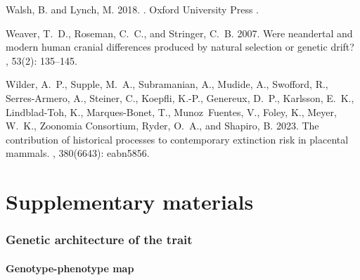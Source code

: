 \documentclass{article}
\renewcommand{\baselinestretch}{1.5}
\providecommand{\DIFdelbegin}{} %
\providecommand{\DIFdelend}{} %
\newcommand{\DIFscaledelfig}{0.5}
\newlength{\DIFdelgraphicswidth} %
\newlength{\DIFdelgraphicsheight} %
\newcommand{\DIFdelincludegraphics}[2][]{%
\sbox{\DIFdelgraphicsbox}{\DIFOincludegraphics[#1]{#2}}%
\settoboxwidth{\DIFdelgraphicswidth}{\DIFdelgraphicsbox} %
\settoboxtotalheight{\DIFdelgraphicsheight}{\DIFdelgraphicsbox} %
\scalebox{\DIFscaledelfig}{%
\parbox[b]{\DIFdelgraphicswidth}{\usebox{\DIFdelgraphicsbox}\\[-\baselineskip] \rule{\DIFdelgraphicswidth}{0em}}\llap{\resizebox{\DIFdelgraphicswidth}{\DIFdelgraphicsheight}{%
\setlength{\unitlength}{\DIFdelgraphicswidth}%
\begin{picture}(1,1)%
\thicklines\linethickness{2pt} %
{\color[rgb]{1,0,0}\put(0,0){\framebox(1,1){}}}%
{\color[rgb]{1,0,0}\put(0,0){\line( 1,1){1}}}%
{\color[rgb]{1,0,0}\put(0,1){\line(1,-1){1}}}%
\end{picture}%
}\hspace*{3pt}}} %
} %
\DeclareRobustCommand{\DIFdelbegin}{\DIFOdelbegin \let\includegraphics\DIFdelincludegraphics} %
\DeclareRobustCommand{\DIFdelend}{\DIFOaddend \let\includegraphics\DIFOincludegraphics} %
\begin{document}
\begin{thebibliography}{}
    Walsh, B. and Lynch, M. 2018.
    .
    \newblock \DIFdelbegin %
\DIFdelend Oxford University Press\DIFdelbegin %
\DIFdelend .

    Weaver, T.~D., Roseman, C.~C., and Stringer, C.~B. 2007.
    \newblock Were neandertal and modern human cranial differences produced by
    natural selection or genetic drift?
    , {53}(2): 135--145.

    Wilder, A.~P., Supple, M.~A., Subramanian, A., Mudide, A., Swofford, R.,
        {Serres-Armero}, A., Steiner, C., Koepfli, K.-P., Genereux, D.~P., Karlsson,
    E.~K., {Lindblad-Toh}, K., {Marques-Bonet}, T., Munoz~Fuentes, V., Foley, K.,
    Meyer, W.~K., {Zoonomia Consortium}, Ryder, O.~A., and Shapiro, B. 2023.
    \newblock The contribution of historical processes to contemporary extinction
    risk in placental mammals.
    , {380}(6643): eabn5856.

\end{thebibliography}



\newpage

\part*{Supplementary materials}
\renewcommand{\thetable}{S\arabic{table}}
\renewcommand{\thefigure}{S\arabic{figure}}
\setcounter{figure}{0}
\setcounter{table}{0}
\setcounter{section}{0}

\renewcommand{\baselinestretch}{1.0}\normalsize
\tableofcontents
\renewcommand{\baselinestretch}{1.5}\normalsize

\newpage
\section{Genetic architecture of the trait}\label{sec:simulator}

\subsection{Genotype-phenotype map}\label{subsec:genotype-phenotype-map}
\end{document}
